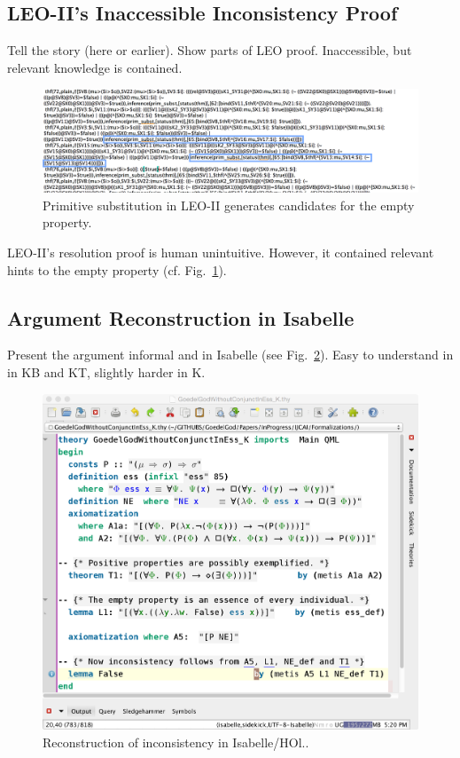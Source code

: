 \documentclass{article}
\begin{document}
\subsection{LEO-II's Inaccessible Inconsistency Proof}
Tell the story (here or earlier). Show parts of LEO proof.  Inaccessible, but relevant knowledge
is contained.
\begin{figure}
\centerline{\includegraphics[width=\textwidth]{./Images/LEO-Proof.png}}
\caption{Primitive substitution in LEO-II generates candidates for the
empty property.} \label{LEO-Proof}
\end{figure}
LEO-II's resolution proof is human unintuitive. However, it contained
relevant hints to the empty property (cf. Fig.~\ref{LEO-Proof}).

\subsection{Argument Reconstruction in Isabelle}
Present the argument informal and in Isabelle (see
Fig.~\ref{InconsistencyIsabelleK}). Easy to understand in 
in KB and KT, slightly harder in K.
\begin{figure}
\centerline{\includegraphics[width=\columnwidth]{./Images/InconsistencyIsabelleK.png}}
\caption{Reconstruction of inconsistency in Isabelle/HOl..} \label{InconsistencyIsabelleK}
\end{figure}
\end{document}
